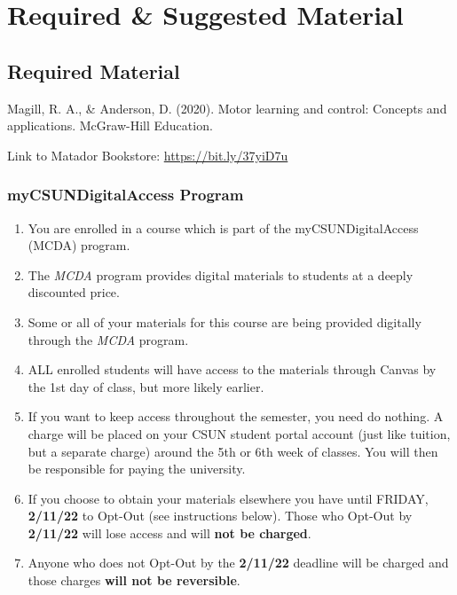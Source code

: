 \documentclass[11pt,]{article}
\providecommand{\tightlist}{%
  \setlength{\itemsep}{0pt}\setlength{\parskip}{0pt}}
\begin{document}
\hypertarget{required-suggested-material}{%
\section{Required \& Suggested
Material}\label{required-suggested-material}}

\hypertarget{required-material}{%
\subsection{Required Material}\label{required-material}}

Magill, R. A., \& Anderson, D. (2020). Motor learning and control:
Concepts and applications. McGraw-Hill Education.

Link to Matador Bookstore: \url{https://bit.ly/37yiD7u}

\hypertarget{mycsundigitalaccess-program}{%
\subsubsection{myCSUNDigitalAccess
Program}\label{mycsundigitalaccess-program}}

\begin{enumerate}
\def\labelenumi{\arabic{enumi}.}
\tightlist
\item
  You are enrolled in a course which is part of the myCSUNDigitalAccess
  (MCDA) program.
\item
  The \emph{MCDA} program provides digital materials to students at a
  deeply discounted price.
\item
  Some or all of your materials for this course are being provided
  digitally through the \emph{MCDA} program.
\item
  ALL enrolled students will have access to the materials through Canvas
  by the 1st day of class, but more likely earlier.
\item
  If you want to keep access throughout the semester, you need do
  nothing. A charge will be placed on your CSUN student portal account
  (just like tuition, but a separate charge) around the 5th or 6th week
  of classes. You will then be responsible for paying the university.
\item
  If you choose to obtain your materials elsewhere you have until
  FRIDAY, \textbf{2/11/22} to Opt-Out (see instructions below). Those
  who Opt-Out by \textbf{2/11/22} will lose access and will \textbf{not
  be charged}.
\item
  Anyone who does not Opt-Out by the \textbf{2/11/22} deadline will be
  charged and those charges \textbf{will not be reversible}.
\end{enumerate}
\end{document}
